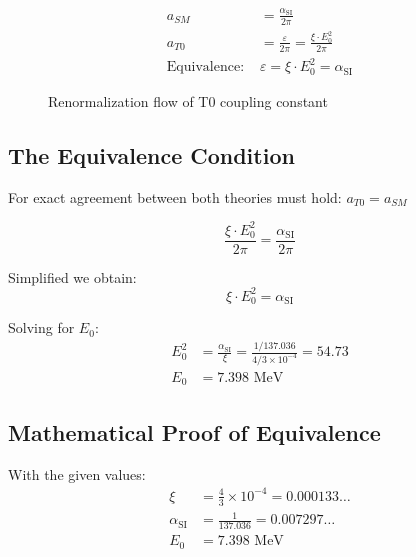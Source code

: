\documentclass[12pt,a4paper]{article}
\numberwithin{equation}{section}
\newcommand{\xipar}{\xi}
\newcommand{\epsilonT}{\varepsilon}
\newcommand{\alphaSI}{\alpha_{\text{SI}}}
\newcommand{\Eo}{E_0}
\begin{document}
	\begin{align}
		a_{SM} &= \frac{\alphaSI}{2\pi} \\
		a_{T0} &= \frac{\epsilonT}{2\pi} = \frac{\xipar \cdot \Eo^2}{2\pi} \\
		\text{Equivalence: } &\epsilonT = \xipar \cdot \Eo^2 = \alphaSI
	\end{align}
	
	\begin{figure}[h]
		\centering
		\caption{Renormalization flow of T0 coupling constant}
		\label{fig:renormalization_flow}
	\end{figure}
	
	\subsection{The Equivalence Condition}
	
	For exact agreement between both theories must hold: $a_{T0} = a_{SM}$
	
	\begin{equation}
		\frac{\xipar \cdot \Eo^2}{2\pi} = \frac{\alphaSI}{2\pi}
		\label{eq:equivalence_condition}
	\end{equation}
	
	Simplified we obtain:
	\begin{equation}
		\xipar \cdot \Eo^2 = \alphaSI
		\label{eq:simplified_equivalence}
	\end{equation}
	
	Solving for $\Eo$:
	\begin{align}
		\Eo^2 &= \frac{\alphaSI}{\xipar} = \frac{1/137.036}{4/3 \times 10^{-4}} = 54.73\\
		\Eo &= 7.398 \text{ MeV}
	\end{align}
	
	\subsection{Mathematical Proof of Equivalence}
	
	With the given values:
	\begin{align}
		\xipar &= \frac{4}{3} \times 10^{-4} = 0.000133\ldots\\
		\alphaSI &= \frac{1}{137.036} = 0.007297\ldots\\
		\Eo &= 7.398 \text{ MeV}
	\end{align}
	
\end{document}
